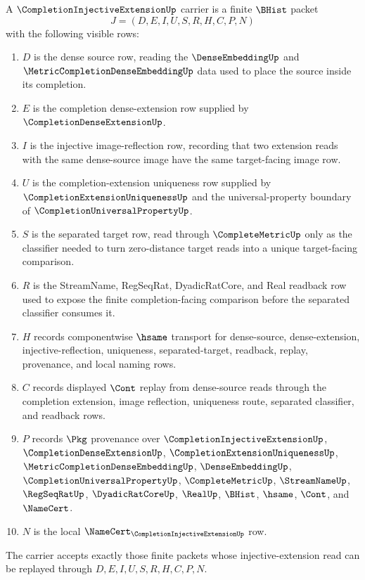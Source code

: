\begin{definition}
\label{def:completion-injective-extension-carrier}
A $\CompletionInjectiveExtensionUp$ carrier is a finite $\BHist$ packet
$$
J=(D,E,I,U,S,R,H,C,P,N)
$$
with the following visible rows:
\begin{enumerate}
\item $D$ is the dense source row, reading the $\DenseEmbeddingUp$ and $\MetricCompletionDenseEmbeddingUp$ data used to place the source inside its completion.
\item $E$ is the completion dense-extension row supplied by $\CompletionDenseExtensionUp$.
\item $I$ is the injective image-reflection row, recording that two extension reads with the same dense-source image have the same target-facing image row.
\item $U$ is the completion-extension uniqueness row supplied by $\CompletionExtensionUniquenessUp$ and the universal-property boundary of $\CompletionUniversalPropertyUp$.
\item $S$ is the separated target row, read through $\CompleteMetricUp$ only as the classifier needed to turn zero-distance target reads into a unique target-facing comparison.
\item $R$ is the StreamName, RegSeqRat, DyadicRatCore, and Real readback row used to expose the finite completion-facing comparison before the separated classifier consumes it.
\item $H$ records componentwise $\hsame$ transport for dense-source, dense-extension, injective-reflection, uniqueness, separated-target, readback, replay, provenance, and local naming rows.
\item $C$ records displayed $\Cont$ replay from dense-source reads through the completion extension, image reflection, uniqueness route, separated classifier, and readback rows.
\item $P$ records $\Pkg$ provenance over $\CompletionInjectiveExtensionUp$, $\CompletionDenseExtensionUp$, $\CompletionExtensionUniquenessUp$, $\MetricCompletionDenseEmbeddingUp$, $\DenseEmbeddingUp$, $\CompletionUniversalPropertyUp$, $\CompleteMetricUp$, $\StreamNameUp$, $\RegSeqRatUp$, $\DyadicRatCoreUp$, $\RealUp$, $\BHist$, $\hsame$, $\Cont$, and $\NameCert$.
\item $N$ is the local $\NameCert_{\CompletionInjectiveExtensionUp}$ row.
\end{enumerate}
The carrier accepts exactly those finite packets whose injective-extension read can be replayed through $D,E,I,U,S,R,H,C,P,N$.
\end{definition}

